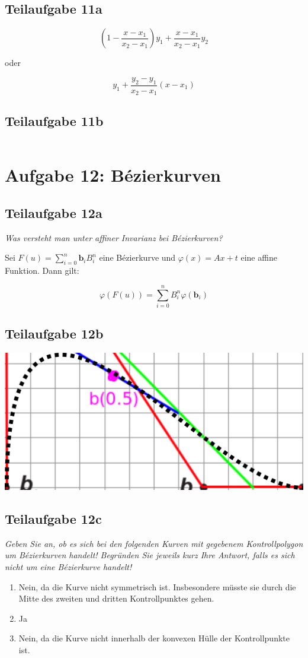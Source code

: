 \documentclass[a4paper]{scrartcl}
\begin{document}
\subsection*{Teilaufgabe 11a}

\[
	\left(1 - \frac{x - x_1}{x_2 - x_1}\right) y_1 + \frac{x - x_1}{x_2 - x_1} y_2
\]

oder

\[
	y_1 + \frac{y_2 - y_1}{x_2 - x_1} (x - x_1)
\]

\clearpage
\subsection*{Teilaufgabe 11b}
\inputminted[linenos, numbersep=5pt, tabsize=4, frame=lines, label=shader.frag]{glsl}{hatching.frag}

\clearpage
\section*{Aufgabe 12: Bézierkurven}
\subsection*{Teilaufgabe 12a}
\textit{Was versteht man unter affiner Invarianz bei Bézierkurven?}

Sei $F(u) = \sum_{i=0}^n \mathbf{b}_i B_i^n$ eine Bézierkurve und
$\varphi(x) = A x + t$ eine affine Funktion. Dann gilt:

\[\varphi(F(u)) = \sum_{i=0}^n B_i^n \varphi(\mathbf{b}_i)\]

\subsection*{Teilaufgabe 12b}
\includegraphics*[width=\linewidth, keepaspectratio]{12b.png}

\subsection*{Teilaufgabe 12c}
\textit{Geben Sie an, ob es sich bei den folgenden Kurven mit gegebenem
Kontrollpolygon um Bézierkurven handelt! Begründen Sie jeweils kurz Ihre
Antwort, falls es sich nicht um eine Bézierkurve handelt!}
\begin{enumerate}
    \item Nein, da die Kurve nicht symmetrisch ist. Insbesondere müsste sie
          durch die Mitte des zweiten und dritten Kontrollpunktes gehen.
    \item Ja
    \item Nein, da die Kurve nicht innerhalb der konvexen Hülle der
          Kontrollpunkte ist.
\end{enumerate}
\end{document}
